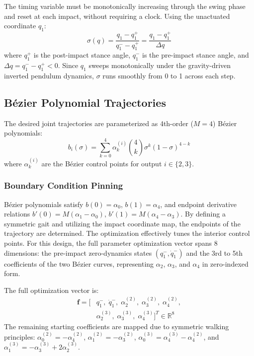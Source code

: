 \documentclass[conference]{IEEEtran}
\begin{document}
The timing variable must be monotonically increasing through the swing phase and reset at each impact, without requiring a clock. Using the unactuated coordinate $q_1$:
\begin{equation}
    \sigma(q) = \frac{q_1 - q_1^+}{q_1^- - q_1^+} = \frac{q_1 - q_1^+}{\Delta q} \label{eq:s}
\end{equation}
where $q_1^+$ is the post-impact stance angle, $q_1^-$ is the pre-impact stance angle, and $\Delta q = q_1^- - q_1^+ < 0$. Since $q_1$ sweeps monotonically under the gravity-driven inverted pendulum dynamics, $\sigma$ runs smoothly from 0 to 1 across each step.

\subsection{B\'ezier Polynomial Trajectories}

The desired joint trajectories are parameterized as 4th-order ($M=4$) B\'ezier polynomials:
\begin{equation}
    b_i(\sigma) = \sum_{k=0}^{4} \alpha_k^{(i)} \binom{4}{k} \sigma^k (1-\sigma)^{4-k} \label{eq:bezier}
\end{equation}
where $\alpha_k^{(i)}$ are the B\'ezier control points for output $i \in \{2,3\}$.

\subsubsection{Boundary Condition Pinning}
B\'ezier polynomials satisfy $b(0)=\alpha_0$, $b(1)=\alpha_4$, and endpoint derivative relations $b'(0)=M(\alpha_1-\alpha_0)$, $b'(1)=M(\alpha_4-\alpha_3)$. By defining a symmetric gait and utilizing the impact coordinate map, the endpoints of the trajectory are determined. The optimization effectively tunes the interior control points. For this design, the full parameter optimization vector spans 8 dimensions: the pre-impact zero-dynamics states $(q_1^-, \dot{q}_1^-)$ and the 3rd to 5th coefficients of the two B\'ezier curves, representing $\alpha_2$, $\alpha_3$, and $\alpha_4$ in zero-indexed form.

The full optimization vector is:
\begin{equation}
\begin{split}
    \bm{f} = \bigl[& q_1^-,\;\dot{q}_1^-,\;\alpha_2^{(2)},\;\alpha_3^{(2)},\;\alpha_4^{(2)}, \\
                   & \alpha_2^{(3)},\;\alpha_3^{(3)},\;\alpha_4^{(3)}\bigr]^T \in \mathbb{R}^8
\end{split}
\label{eq:fvec}
\end{equation}
The remaining starting coefficients are mapped due to symmetric walking principles: $\alpha_0^{(2)} = -\alpha_4^{(2)}$, $\alpha_1^{(2)} = -\alpha_3^{(2)}$, $\alpha_0^{(3)} = \alpha_4^{(3)} - \alpha_4^{(2)}$, and $\alpha_1^{(3)} = -\alpha_3^{(3)} + 2\alpha_2^{(3)}$.
\end{document}
